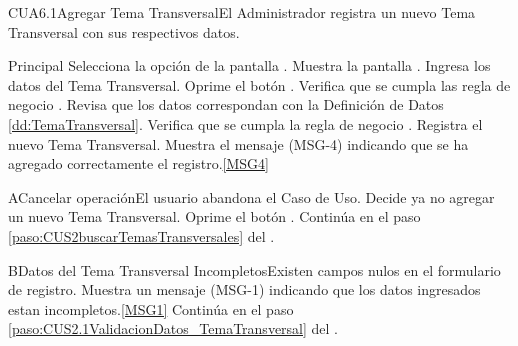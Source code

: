 	\begin{UseCase}{CUA6.1}{Agregar Tema Transversal}{El Administrador registra un nuevo Tema Transversal con sus respectivos datos.}
	\end{UseCase}

	\begin{UCtrayectoria}{Principal}
			\UCpaso[\UCactor] Selecciona la opción  de la pantalla .
			\UCpaso Muestra la pantalla .
			\UCpaso [\UCactor] Ingresa los datos del Tema Transversal.  \label{paso:CUS2.1ValidacionDatos_TemaTransversal}
			\UCpaso [\UCactor] Oprime el botón .
			\UCpaso Verifica que se cumpla las regla de negocio .  
			\UCpaso Revisa que los datos correspondan con la Definición de Datos \ref{dd:TemaTransversal}. 
			\UCpaso Verifica que se cumpla la regla de negocio .  
			\UCpaso Registra el nuevo Tema Transversal.
			\UCpaso Muestra el mensaje (MSG-4) indicando que se ha agregado correctamente el registro.\ref{MSG4}
	\end{UCtrayectoria}

	\begin{UCtrayectoriaA}{A}{Cancelar operación}{El usuario abandona el Caso de Uso.}
			\UCpaso[\UCactor] Decide ya no agregar un nuevo Tema Transversal.
			\UCpaso[\UCactor] Oprime el botón .
			\UCpaso Continúa en el paso \ref{paso:CUS2buscarTemasTransversales} del .
	\end{UCtrayectoriaA}
		
	\begin{UCtrayectoriaA}{B}{Datos del Tema Transversal Incompletos}{Existen campos nulos en el formulario de registro.}
			\UCpaso Muestra un mensaje (MSG-1) indicando que los datos ingresados estan incompletos.\ref{MSG1}
			\UCpaso Continúa en el paso \ref{paso:CUS2.1ValidacionDatos_TemaTransversal} del .
	\end{UCtrayectoriaA}


